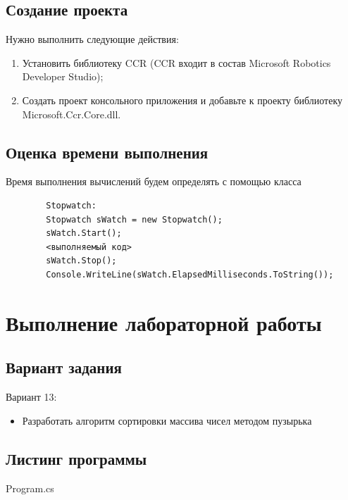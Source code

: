 \documentclass[russian,utf8,pointsection]{eskdtext}
\begin{document}
       \subsection{Создание проекта}
       Нужно выполнить следующие действия:
       \begin{enumerate}
       \item Установить библиотеку CCR (CCR входит в состав Microsoft Robotics Developer Studio);
       \item Создать проект консольного приложения и добавьте к проекту библиотеку Microsoft.Ccr.Core.dll.
       	\end{enumerate}
       	
       	\subsection{Оценка времени выполнения}
       	Время выполнения вычислений будем определять с помощью класса
       	\begin{lstlisting}
       	Stopwatch:       	
       	Stopwatch sWatch = new Stopwatch();       	
       	sWatch.Start();       	
       	<выполняемый код>       	
       	sWatch.Stop();       	
       	Console.WriteLine(sWatch.ElapsedMilliseconds.ToString());
       	      	\end{lstlisting}
       	
       	\section{Выполнение лабораторной работы}
       		\subsection{Вариант задания}
       		Вариант 13:
       		\begin{itemize}
       			\item Разработать алгоритм сортировки массива чисел методом пузырька
       		\end{itemize}
       	\subsection{Листинг программы}
       
     
  
   {Program.cs}
       	
\end{document}
